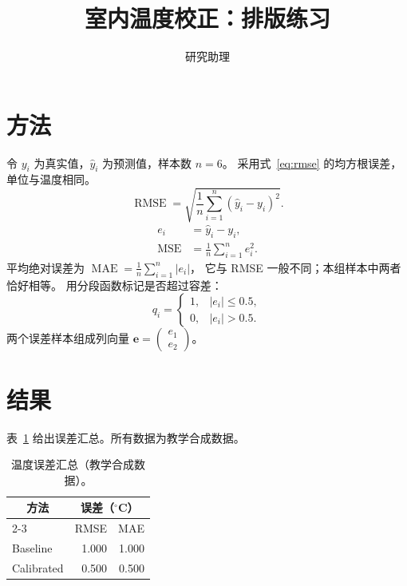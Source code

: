 \documentclass[UTF8,fontset=fandol,a4paper,11pt]{ctexart}
\title{室内温度校正：排版练习}
\author{研究助理}
\date{}
\begin{document}
\maketitle
\section{方法}\label{sec:method}
令 $y_i$ 为真实值，$\hat y_i$ 为预测值，样本数 $n=6$。
采用式~\eqref{eq:rmse} 的均方根误差，单位与温度相同。
\begin{equation}
 \operatorname{RMSE}=\sqrt{\frac{1}{n}\sum_{i=1}^{n}(\hat y_i-y_i)^2}.
 \label{eq:rmse}
\end{equation}
\begin{align}
 e_i &= \hat y_i-y_i,\label{eq:error}\\
 \operatorname{MSE} &= \frac{1}{n}\sum_{i=1}^{n}e_i^2.\label{eq:mse}
\end{align}
平均绝对误差为 $\operatorname{MAE}=\frac{1}{n}\sum_{i=1}^{n}|e_i|$，
它与 RMSE 一般不同；本组样本中两者恰好相等。
用分段函数标记是否超过容差：
\begin{equation*}
 q_i=\begin{cases}1,&|e_i|\leq 0.5,\\0,&|e_i|>0.5.\end{cases}
\end{equation*}
两个误差样本组成列向量 $\boldsymbol e=\begin{pmatrix}e_1\\e_2\end{pmatrix}$。
\section{结果}表~\ref{tab:metrics} 给出误差汇总。所有数据为教学合成数据。\begin{table}[htbp]
 \centering
 \caption{温度误差汇总（教学合成数据）。}\label{tab:metrics}
 \begin{tabular}{lrr}
  \toprule
  \multicolumn{1}{c}{方法} & \multicolumn{2}{c}{误差（$^\circ$C）}\\
  \cmidrule(lr){2-3}
   & RMSE & MAE\\
  \midrule
  Baseline & 1.000 & 1.000\\
  Calibrated & 0.500 & 0.500\\
  \bottomrule
 \end{tabular}
\end{table}
\end{document}
